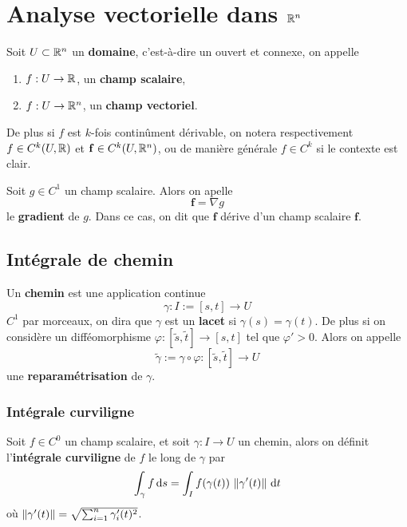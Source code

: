 \chapter{Analyse vectorielle dans $\mathbb{R}^n$}
\minisommaire
\begin{definition}
	Soit $U \subset \mathbb{R}^n$ un \textbf{domaine}, c'est-à-dire un ouvert et connexe, on appelle
	\begin{enumerate}
		\item $f : U \to \mathbb{R}$, un \textbf{champ scalaire},
		\item $f : U \to \mathbb{R}^n$, un \textbf{champ vectoriel}.
	\end{enumerate}
	De plus si $f$ est $k$-fois continûment dérivable, on notera respectivement $f \in C^k(U, \mathbb{R})$ et $\mathbf{f} \in C^k(U, \mathbb{R}^n)$, ou de manière générale $f \in C^k$ si le contexte est clair.
\end{definition}

\begin{definition}[Gradient] \label{def: Gradient}
	Soit $g \in C^1$ un champ scalaire. Alors on apelle
	\[
	\bm f = \nabla g
	\]
	le \textbf{gradient} de $g$. Dans ce cas, on dit que $\bm f$ dérive d'un champ scalaire $\bm f$.
\end{definition}

\section{Intégrale de chemin}
 
 \begin{definition} \label{def: Chemin et reparamétrisation}
 	Un \textbf{chemin} est une application continue
 	\[
 	\gamma : I := [s,t] \to U
 	\]
 	$C^1$ par morceaux, on dira que $\gamma$ est un \textbf{lacet} si $\gamma(s) = \gamma(t)$. De plus si on considère un difféomorphisme $\varphi : [\tilde s, \tilde t] \to [s,t]$ tel que $\varphi' > 0$. Alors on appelle
 	\[
 	\tilde \gamma := \gamma \circ \varphi : [\tilde s, \tilde t] \to U
 	\]
 	une \textbf{reparamétrisation} de $\gamma$.
 \end{definition}
 
 \subsection{Intégrale curviligne}

 \begin{definition} \label{def: Intégrale curviligne}
 	Soit $f \in C^0$ un champ scalaire, et soit $\gamma : I \to U$ un chemin, alors on définit l'\textbf{intégrale curviligne} de $f$ le long de $\gamma$ par
 	\[
 	\int_\gamma f  \, \mathrm ds = \int_I f(\gamma(t)) \, \left\| \gamma'(t) \right\| \, \mathrm dt
 	\]
 	où $\left\| \gamma'(t) \right\| = \sqrt{\sum_{i=1}^n \gamma_i'(t)^2}$.
 \end{definition}
 
